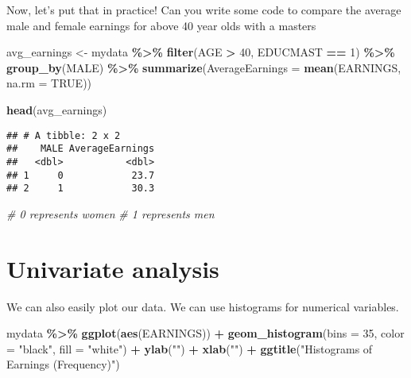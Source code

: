 \documentclass[
]{article}
\newenvironment{Shaded}{\begin{snugshade}}{\end{snugshade}}
\newcommand{\AttributeTok}[1]{\textcolor[rgb]{0.13,0.29,0.53}{#1}}
\newcommand{\CommentTok}[1]{\textcolor[rgb]{0.56,0.35,0.01}{\textit{#1}}}
\newcommand{\ConstantTok}[1]{\textcolor[rgb]{0.56,0.35,0.01}{#1}}
\newcommand{\DecValTok}[1]{\textcolor[rgb]{0.00,0.00,0.81}{#1}}
\newcommand{\FunctionTok}[1]{\textcolor[rgb]{0.13,0.29,0.53}{\textbf{#1}}}
\newcommand{\NormalTok}[1]{#1}
\newcommand{\OtherTok}[1]{\textcolor[rgb]{0.56,0.35,0.01}{#1}}
\newcommand{\SpecialCharTok}[1]{\textcolor[rgb]{0.81,0.36,0.00}{\textbf{#1}}}
\newcommand{\StringTok}[1]{\textcolor[rgb]{0.31,0.60,0.02}{#1}}
\begin{document}
Now, let's put that in practice! Can you write some code to compare the
average male and female earnings for above 40 year olds with a masters

\begin{Shaded}
\begin{Highlighting}[]
\NormalTok{avg\_earnings }\OtherTok{\textless{}{-}}\NormalTok{ mydata }\SpecialCharTok{\%\textgreater{}\%}
  \FunctionTok{filter}\NormalTok{(AGE }\SpecialCharTok{\textgreater{}} \DecValTok{40}\NormalTok{, EDUCMAST }\SpecialCharTok{==} \DecValTok{1}\NormalTok{) }\SpecialCharTok{\%\textgreater{}\%}
  \FunctionTok{group\_by}\NormalTok{(MALE) }\SpecialCharTok{\%\textgreater{}\%}
  \FunctionTok{summarize}\NormalTok{(}\AttributeTok{AverageEarnings =} \FunctionTok{mean}\NormalTok{(EARNINGS, }\AttributeTok{na.rm =} \ConstantTok{TRUE}\NormalTok{))}

\FunctionTok{head}\NormalTok{(avg\_earnings)}
\end{Highlighting}
\end{Shaded}

\begin{verbatim}
## # A tibble: 2 x 2
##    MALE AverageEarnings
##   <dbl>           <dbl>
## 1     0            23.7
## 2     1            30.3
\end{verbatim}

\begin{Shaded}
\begin{Highlighting}[]
\CommentTok{\# 0 represents women}
\CommentTok{\# 1 represents men}
\end{Highlighting}
\end{Shaded}

\hypertarget{univariate-analysis}{%
\section{Univariate analysis}\label{univariate-analysis}}

We can also easily plot our data. We can use histograms for numerical
variables.

\begin{Shaded}
\begin{Highlighting}[]
\NormalTok{mydata }\SpecialCharTok{\%\textgreater{}\%} 
  \FunctionTok{ggplot}\NormalTok{(}\FunctionTok{aes}\NormalTok{(EARNINGS)) }\SpecialCharTok{+}
    \FunctionTok{geom\_histogram}\NormalTok{(}\AttributeTok{bins =} \DecValTok{35}\NormalTok{, }
                   \AttributeTok{color =} \StringTok{"black"}\NormalTok{, }
                   \AttributeTok{fill =} \StringTok{"white"}\NormalTok{) }\SpecialCharTok{+}
    \FunctionTok{ylab}\NormalTok{(}\StringTok{""}\NormalTok{) }\SpecialCharTok{+} 
    \FunctionTok{xlab}\NormalTok{(}\StringTok{""}\NormalTok{) }\SpecialCharTok{+}
    \FunctionTok{ggtitle}\NormalTok{(}\StringTok{"Histograms of Earnings (Frequency)"}\NormalTok{)  }
\end{Highlighting}
\end{Shaded}
\end{document}
